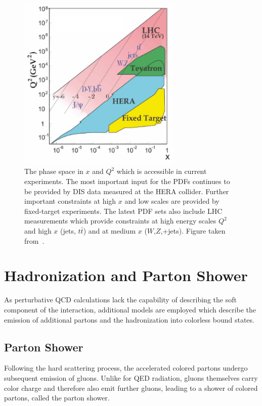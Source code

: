 \begin{figure}[tb] 
    \centering
    \includegraphics[width=0.7\textwidth]{figures/theoretical_foundations/phasespace.pdf}\hfill
    \caption[Kinematic phase space region of the experiments]{The phase space
        in $x$ and $Q^2$ which is accessible in current experiments.  The most
        important input for the PDFs continues to be provided by DIS
        data measured at the HERA collider. Further important constraints at
        high $x$ and low scales are provided by fixed-target experiments. The
        latest PDF sets also include LHC measurements which provide constraints
        at high energy scales $Q^2$ and high $x$ (jets, $t\bar t$) and at medium $x$
        ($W$,$Z$,+jets). Figure taken from~\cite{Agashe:2014kda}.} 
    \label{fig:kinematic_phasepace} 
\end{figure}

\section{Hadronization and Parton Shower}

As perturbative QCD calculations lack the capability of describing the
soft component of the interaction, additional models are employed which describe
the emission of additional partons and the hadronization into colorless bound
states. 

\subsection{Parton Shower}

Following the hard scattering process, the accelerated colored partons undergo
subsequent emission of gluons. Unlike for QED radiation, gluons themselves carry
color charge and therefore also emit further gluons, leading to a shower of
colored partons, called the parton shower.

